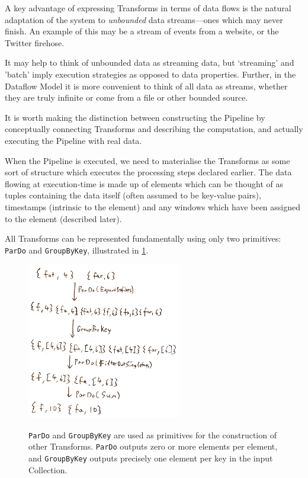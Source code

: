 A key advantage of expressing Transforms in terms of data flows is the natural adaptation of the system to \emph{unbounded} data streams---ones which may never finish.
An example of this may be a stream of events from a website, or the Twitter firehose.

It may help to think of unbounded data as streaming data, but `streaming' and 'batch' imply execution strategies as opposed to data properties.
Further, in the Dataflow Model it is more convenient to think of all data as streams, whether they are truly infinite or come from a file or other bounded source.

It is worth making the distinction between constructing the Pipeline by conceptually connecting Transforms and describing the computation, and actually executing the Pipeline with real data.

When the Pipeline is executed, we need to materialise the Transforms as some sort of structure which executes the processing steps declared earlier.
The data flowing at execution-time is made up of elements which can be thought of as tuples containing the data itself (often assumed to be key-value pairs), timestamps (intrinsic to the element) and any windows which have been assigned to the element (described later).

All Transforms can be represented fundamentally using only two primitives: \verb|ParDo| and \verb|GroupByKey|\footnotemark[2], illustrated in \cref{fig:prep:pardo-gbk}.


\begin{figure}[h]
	\centering
	\includegraphics[width=0.6\textwidth]{images/temp/pardo-gbk}
	\label{fig:prep:pardo-gbk}
	\caption[An illustration of the operation of \texttt{ParDo} and \texttt{GroupByKey}.]{\texttt{ParDo} and \texttt{GroupByKey} are used as primitives for the construction of other Transforms. \texttt{ParDo} outputs zero or more elements per element, and \texttt{GroupByKey} outputs precisely one element per key in the input Collection.}
\end{figure}


